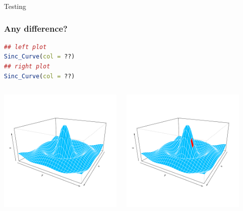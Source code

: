 \documentclass{beamer}
\begin{document}
\begin{frame}[fragile]

\end{frame}


\begin{frame}
\begin{center}
\Huge Testing
\end{center}
\end{frame}


\begin{frame}[fragile]
\frametitle{Any difference?}
\begin{lstlisting}[language = R]
## left plot
Sinc_Curve(col = ??)
## right plot
Sinc_Curve(col = ??)
\end{lstlisting}

\begin{columns}[c]
\includegraphics[height = 6cm, width = 6cm]{plot/persp_diff_1.pdf}

\includegraphics[height = 6cm, width = 6cm]{plot/persp_diff_2.pdf}

\end{columns}
\end{frame}
\end{document}
